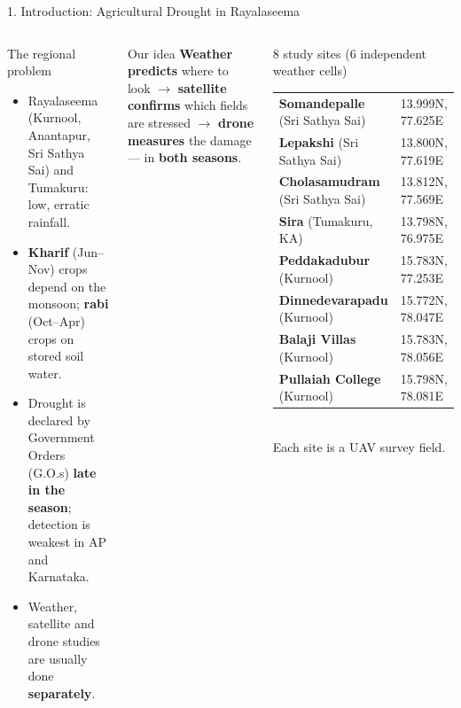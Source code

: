 \documentclass[aspectratio=169,10pt]{beamer}
\begin{document}
\begin{frame}{1. Introduction: Agricultural Drought in Rayalaseema}
\begin{columns}[T]
\begin{block}{The regional problem}
\footnotesize
\begin{itemize}
\item Rayalaseema (Kurnool, Anantapur, Sri Sathya Sai) and Tumakuru: low, erratic rainfall.
\item \textbf{Kharif} (Jun--Nov) crops depend on the monsoon; \textbf{rabi} (Oct--Apr) crops on stored soil water.
\item Drought is declared by Government Orders (G.O.s) \textbf{late in the season}; detection is weakest in AP and Karnataka.
\item Weather, satellite and drone studies are usually done \textbf{separately}.
\end{itemize}
\end{block}
\begin{block}{Our idea}
\footnotesize \textbf{Weather predicts} where to look $\rightarrow$ \textbf{satellite confirms} which fields are stressed $\rightarrow$ \textbf{drone measures} the damage --- in \textbf{both seasons}.
\end{block}
\begin{block}{8 study sites (6 independent weather cells)}
\footnotesize
\begin{tabular}{@{}ll@{}}
\textbf{Somandepalle} (Sri Sathya Sai) & 13.999N, 77.625E \\
\textbf{Lepakshi} (Sri Sathya Sai) & 13.800N, 77.619E \\
\textbf{Cholasamudram} (Sri Sathya Sai) & 13.812N, 77.569E \\
\textbf{Sira} (Tumakuru, KA) & 13.798N, 76.975E \\
\textbf{Peddakadubur} (Kurnool) & 15.783N, 77.253E \\
\textbf{Dinnedevarapadu} (Kurnool) & 15.772N, 78.047E \\
\textbf{Balaji Villas} (Kurnool) & 15.783N, 78.056E \\
\textbf{Pullaiah College} (Kurnool) & 15.798N, 78.081E \\
\end{tabular}\\[3pt]
Each site is a UAV survey field.
\end{block}
\end{columns}
\end{frame}
\end{document}
